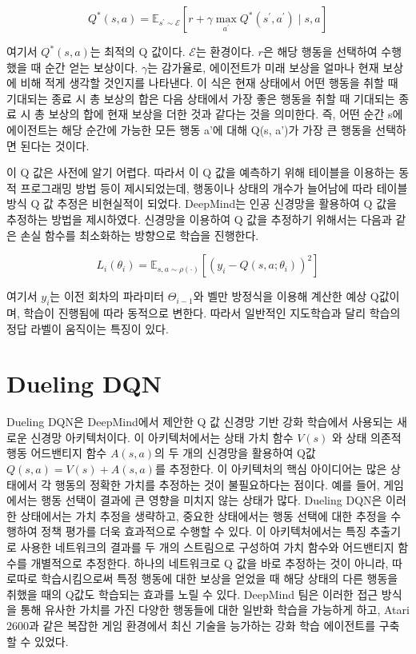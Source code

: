 \documentclass[oneside, under, ko]{snuthesis}
\begin{document}
\[
Q^*(s, a) = \mathbb{E}_{s^{\prime} \sim \mathcal{E}}\left[r+\gamma \max _{a^{\prime}} Q^*\left(s^{\prime}, a^{\prime}\right) \mid s, a\right]
\]

여기서 $Q^*(s, a)$는 최적의 Q 값이다. $\mathcal{E}$는 환경이다. $r$은 해당 행동을 선택하여 수행했을 때 순간 얻는 보상이다. $\gamma$는 감가율로, 에이전트가 미래 보상을 얼마나 현재 보상에 비해 적게 생각할 것인지를 나타낸다. 이 식은 현재 상태에서 어떤 행동을 취할 때 기대되는 종료 시 총 보상의 합은 다음 상태에서 가장 좋은 행동을 취할 때 기대되는 종료 시 총 보상의 합에 현재 보상을 더한 것과 같다는 것을 의미한다. 즉, 어떤 순간 s에 에이전트는 해당 순간에 가능한 모든 행동 a'에 대해 Q(s, a')가 가장 큰 행동을 선택하면 된다는 것이다.

이 Q 값은 사전에 알기 어렵다. 따라서 이 Q 값을 예측하기 위해 테이블을 이용하는 동적 프로그래밍 방법 등이 제시되었는데, 행동이나 상태의 개수가 늘어남에 따라 테이블 방식 Q 값 추정은 비현실적이 되었다. DeepMind는 인공 신경망을 활용하여 Q 값을 추정하는 방법을 제시하였다. 신경망을 이용하여 Q 값을 추정하기 위해서는 다음과 같은 손실 함수를 최소화하는 방향으로 학습을 진행한다.

\[
    L_i\left(\theta_i\right)=\mathbb{E}_{s, a \sim \rho(\cdot)}\left[\left(y_i-Q\left(s, a ; \theta_i\right)\right)^2\right]
\]

여기서 $y_i$는 이전 회차의 파라미터 $\Theta_{i-1}$와 벨만 방정식을 이용해 계산한 예상 Q값이며, 학습이 진행됨에 따라 동적으로 변한다. 따라서 일반적인 지도학습과 달리 학습의 정답 라벨이 움직이는 특징이 있다. 

\section{Dueling DQN \cite{DuelingDQN}}
Dueling DQN은 DeepMind에서 제안한 Q 값 신경망 기반 강화 학습에서 사용되는 새로운 신경망 아키텍처이다. 이 아키텍처에서는 상태 가치 함수 $V(s)$ 와 상태 의존적 행동 어드밴티지 함수 $A(s, a)$의 두 개의 신경망을 활용하여 Q값 $Q(s,a) = V(s) + A(s, a)$를 추정한다. 이 아키텍처의 핵심 아이디어는 많은 상태에서 각 행동의 정확한 가치를 추정하는 것이 불필요하다는 점이다. 예를 들어, 게임에서는 행동 선택이 결과에 큰 영향을 미치지 않는 상태가 많다. Dueling DQN은 이러한 상태에서는 가치 추정을 생략하고, 중요한 상태에서는 행동 선택에 대한 추정을 수행하여 정책 평가를 더욱 효과적으로 수행할 수 있다. 이 아키텍처에서는 특징 추출기로 사용한 네트워크의 결과를 두 개의 스트림으로 구성하여 가치 함수와 어드밴티지 함수를 개별적으로 추정한다. 하나의 네트워크로 Q 값을 바로 추정하는 것이 아니라, 따로따로 학습시킴으로써 특정 행동에 대한 보상을 얻었을 때 해당 상태의 다른 행동을 취했을 때의 Q값도 학습되는 효과를 노릴 수 있다. DeepMind 팀은 이러한 접근 방식을 통해 유사한 가치를 가진 다양한 행동들에 대한 일반화 학습을 가능하게 하고, Atari 2600과 같은 복잡한 게임 환경에서 최신 기술을 능가하는 강화 학습 에이전트를 구축할 수 있었다. 
\end{document}
